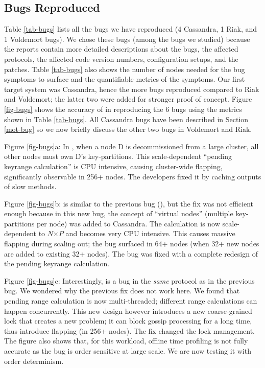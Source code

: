 

\subsection{Bugs Reproduced}
\label{eval-bugs}



Table \ref{tab-bugs} lists all the \numEval bugs we have reproduced (4
Cassandra, 1 Riak, and 1 Voldemort bugs).  We chose these \numEval bugs (among
the \totAll bugs we studied) because the reports contain more detailed
descriptions about the bugs, the affected protocols, the affected code version
numbers, configuration setups, and the patches.  Table \ref{tab-bugs} also
shows the number of nodes needed for the bug symptoms to surface and the
quantifiable metrics of the symptoms.
%
Our first target system was Cassandra, hence the more bugs reproduced compared
to Riak and Voldemort; the latter two were added for  stronger proof of
concept.
%
Figure \ref{fig-bugs} shows the accuracy of \sck in reproducing the 6 bugs
using the metrics shown in Table \ref{tab-bugs}.
%
%
%
All Cassandra bugs have been described in Section \ref{mot-bug} so we now
briefly discuss the other two bugs in Voldemort and Riak.



Figure \ref{fig-bugs}a: In \catwo \cite{CA-Two}, 
when a node D is decommissioned from a
large cluster, all other nodes must own D's key-partitions.
This scale-dependent ``pending keyrange calculation'' is CPU intensive,
causing cluster-wide flapping, significantly observable in 256+ nodes.
The developers fixed it by caching outputs of slow methods.

Figure \ref{fig-bugs}b: \catri \cite{CA-Tri} 
is similar to the previous bug (\catwo),
but the fix was not efficient enough because in this new bug, the concept
of ``virtual nodes'' (multiple key-partitions per node) was added to
Cassandra.  The calculation is now scale-dependent to $N$$\times$$P$ and
becomes very CPU intensive.  This causes massive flapping during scaling out; 
the bug surfaced in 64+ nodes (when 32+ new nodes are added
to existing 32+ nodes). The bug was fixed with a complete 
redesign of the pending keyrange calculation.
%

Figure \ref{fig-bugs}c: Interestingly, \cafour \cite{CA-Four} is 
a bug in the {\em same}
protocol as in the previous bug.  We wondered why the previous fix does
not work here.  We found that pending range calculation is now
multi-threaded; different range calculations can happen concurrently.
This new design however introduces a new coarse-grained lock that creates
a new problem;  it can block gossip processing for a long
time, thus introduce flapping (in 256+ nodes).  The fix changed the
lock management.
%
The figure also shows that, for this workload, offline time profiling
is not fully accurate as the bug is order sensitive at large scale.
We are now testing it with order determinism. 
\fi

